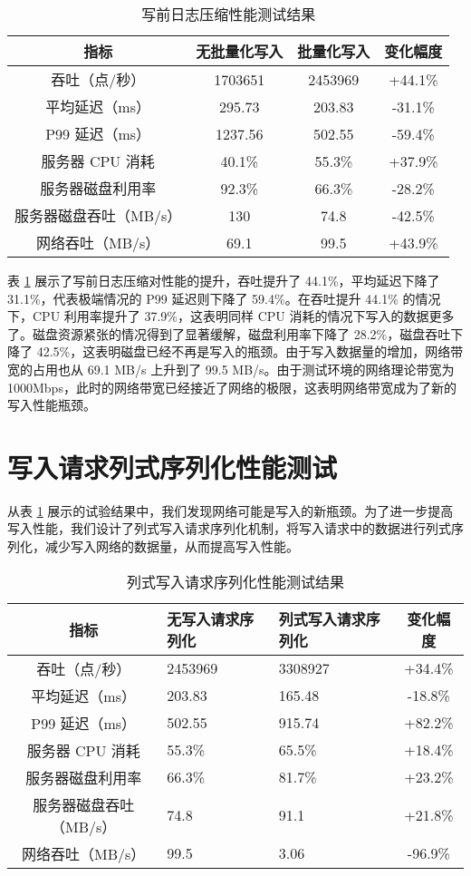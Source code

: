 \begin{table}
  \centering
  \caption{写前日志压缩性能测试结果}
  \begin{tabular}{cccc}
    \toprule 
    指标 & 无批量化写入 & 批量化写入 & 变化幅度 \\
    \midrule
    吞吐（点/秒） & 1703651 & 2453969 & +44.1\%\\
    平均延迟（ms） & 295.73 & 203.83 & -31.1\%\\
    P99 延迟（ms） & 1237.56 & 502.55& -59.4\% \\
    服务器 CPU 消耗 & 40.1\% & 	55.3\% & +37.9\%\\
    服务器磁盘利用率 & 92.3\% & 	66.3\% & -28.2\%\\
    服务器磁盘吞吐（MB/s） & 130 & 	74.8 & -42.5\% \\
    网络吞吐（MB/s） & 69.1 & 	99.5 & +43.9\%\\
    \bottomrule 
  \end{tabular}
  \label{tabular:wal-compression-performance}
\end{table}

表 \ref{tabular:wal-compression-performance} 展示了写前日志压缩对性能的提升，吞吐提升了 44.1\%，平均延迟下降了 31.1\%，代表极端情况的 P99 延迟则下降了 59.4\%。在吞吐提升 44.1\% 的情况下，CPU 利用率提升了 37.9\%，这表明同样 CPU 消耗的情况下写入的数据更多了。磁盘资源紧张的情况得到了显著缓解，磁盘利用率下降了 28.2\%，磁盘吞吐下降了 42.5\%，这表明磁盘已经不再是写入的瓶颈。由于写入数据量的增加，网络带宽的占用也从 69.1 MB/s 上升到了 99.5 MB/s。由于测试环境的网络理论带宽为 1000Mbps，此时的网络带宽已经接近了网络的极限，这表明网络带宽成为了新的写入性能瓶颈。


\section{写入请求列式序列化性能测试}
从表 \ref{tabular:wal-compression-performance} 展示的试验结果中，我们发现网络可能是写入的新瓶颈。为了进一步提高写入性能，我们设计了列式写入请求序列化机制，将写入请求中的数据进行列式序列化，减少写入网络的数据量，从而提高写入性能。

\begin{table}
  \centering
  \caption{列式写入请求序列化性能测试结果}
  \begin{tabular}{cp{3.5cm}p{3.5cm}c}
    \toprule 
    指标 &  无写入请求序列化 & 列式写入请求序列化 & 变化幅度 \\
    \midrule  
    吞吐（点/秒） & 2453969 & 3308927 & +34.4\%\\  
    平均延迟（ms） & 203.83 & 165.48 & -18.8\%\\  
    P99 延迟（ms） & 502.55 & 915.74 & +82.2\%\\  
    服务器 CPU 消耗 & 55.3\% & 65.5\% & +18.4\%\\  
    服务器磁盘利用率 & 66.3\% & 81.7\% & +23.2\%\\  
    服务器磁盘吞吐（MB/s） & 74.8 & 91.1 & +21.8\%\\  
    网络吞吐（MB/s） & 99.5 & 3.06 & -96.9\%\\  
    \bottomrule 
  \end{tabular}
  \label{tabular:columnar-serialization-performance}
\end{table}


